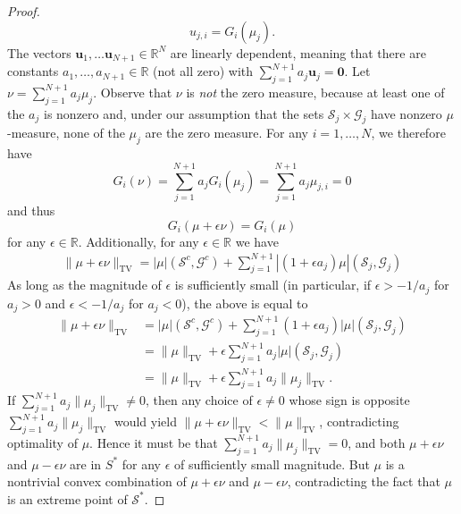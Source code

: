 \documentclass{article}
\DeclareMathOperator{\TV}{TV}
\def\vzero{{\bm{0}}}
\def\vu{{\bm{u}}}
\def\cG{{\mathcal{G}}}
\def\cS{{\mathcal{S}}}
\newcommand{\R}{\mathbb{R}}
\begin{document}
\begin{appendices}
\begin{proof}
    \begin{equation}
        u_{j,i} = G_i(\mu_j).
    \end{equation}
    The vectors $\vu_1, \dots \vu_{N+1} \in \R^N$ are linearly dependent, meaning that there are constants $a_1, \dots, a_{N+1} \in \R$ (not all zero) with $\sum_{j=1}^{N+1} a_j \vu_j = \vzero$. Let $\nu = \sum_{j=1}^{N+1} a_j \mu_j$. Observe that $\nu$ is \textit{not} the zero measure, because at least one of the $a_j$ is nonzero and, under our assumption that the sets $\cS_j \times \cG_j$ have nonzero $\mu$-measure, none of the $\mu_j$ are the zero measure. For any $i = 1, \dots, N$, we therefore have
    \begin{equation}
        G_i(\nu) =  \sum_{j=1}^{N+1} a_j G_i(\mu_j) =  \sum_{j=1}^{N+1} a_j \mu_{j,i} = 0
    \end{equation}
    and thus
    \begin{equation}
        G_i(\mu + \epsilon \nu) =  G_i(\mu) 
    \end{equation}
    for any $\epsilon \in \R$. Additionally, for any $\epsilon \in \R$ we have
    \begin{align}
        \| \mu + \epsilon \nu \|_{\TV} = | \mu | \left( \cS^c, \cG^c \right) + \sum_{j=1}^{N+1}  | (1 + \epsilon a_j) \mu | (\cS_j,\cG_j) 
    \end{align}
    As long as the magnitude of $\epsilon$ is sufficiently small (in particular, if $\epsilon > -1/a_j$ for $a_j > 0$ and $\epsilon < -1/a_j$ for $a_j < 0$), the above is equal to 
    \begin{align}
        \| \mu + \epsilon \nu \|_{\TV} &= | \mu | \left( \cS^c, \cG^c \right) + \sum_{j=1}^{N+1} (1+\epsilon a_j)  |  \mu | (\cS_j,\cG_j) \\
        &= \| \mu \|_{\TV} + \epsilon \sum_{j=1}^{N+1} a_j |\mu|(\cS_j,\cG_j) \\
        &= \| \mu \|_{\TV} + \epsilon \sum_{j=1}^{N+1} a_j \| \mu_j \|_{\TV}.
    \end{align}
    If $\sum_{j=1}^{N+1} a_j \| \mu_j \|_{\TV} \neq 0$, then any choice of $\epsilon \neq 0$ whose sign is opposite $\sum_{j=1}^{N+1} a_j \| \mu_j \|_{\TV}$ would yield $\| \mu + \epsilon \nu \|_{\TV} < \| \mu \|_{\TV}$, contradicting optimality of $\mu$. Hence it must be that $\sum_{j=1}^{N+1} a_j \| \mu_j \|_{\TV} = 0$, and both $\mu + \epsilon \nu$ and $\mu - \epsilon \nu$ are in $S^*$ for any $\epsilon$ of sufficiently small magnitude. But $\mu$ is a nontrivial convex combination of $\mu + \epsilon \nu$ and $\mu - \epsilon \nu$, contradicting the fact that $\mu$ is an extreme point of $\cS^*$.


\end{proof}
\end{appendices}
\end{document}
